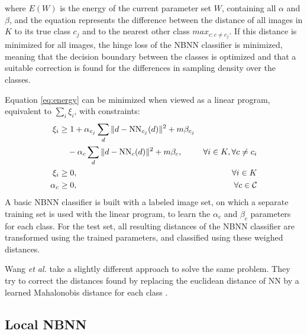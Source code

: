 where $E(W)$ is the energy of the current parameter set $W$, containing all $\alpha$ and $\beta$, and the equation represents the difference between the distance of all images in $K$ to its true class $c_j$ and to the nearest other class $max_{c:c\neq c_j}$. If this distance is minimized for all images, the hinge loss of the NBNN classifier is minimized, meaning that the decision boundary between the classes is optimized and that a suitable correction is found for the differences in sampling density over the classes.

Equation \eqref{eq:energy} can be minimized when viewed as a linear program, equivalent to $\sum_i \xi_i$, with constraints:
\begin{align}
    \xi_i &\geq 1 +\alpha_{c_j} \sum_d \|d - \text{NN}_{c_j}(d)\|^2 + m\beta_{c_j}&\notag\\
    \label{eq:linprog1}
    &\quad-\alpha_{c} \sum_d \|d - \text{NN}_{c}(d)\|^2 + m\beta_{c}, &\forall i \in K, \forall c \neq c_i\\
    \label{eq:linprog2}
    \xi_i &\geq 0, &\forall i \in K\\
    \label{eq:linprog3}
    \alpha_c &\geq 0, &\forall c \in \mathcal{C}
\end{align}
A basic NBNN classifier is built with a labeled image set, on which a separate training set is used with the linear program, to learn the $\alpha_c$ and $\beta_c$ parameters for each class. For the test set, all resulting distances of the NBNN classifier are transformed using the trained parameters, and classified using these weighed distances.

Wang \emph{et al.} take a slightly different approach to solve the same problem. They try to correct the distances found by replacing the euclidean distance of NN by a learned Mahalonobis distance for each class .


\begin{figure}[hbt]
    \centering
\end{figure}


\subsection{Local NBNN} %
\label{sec:local_nbnn}

